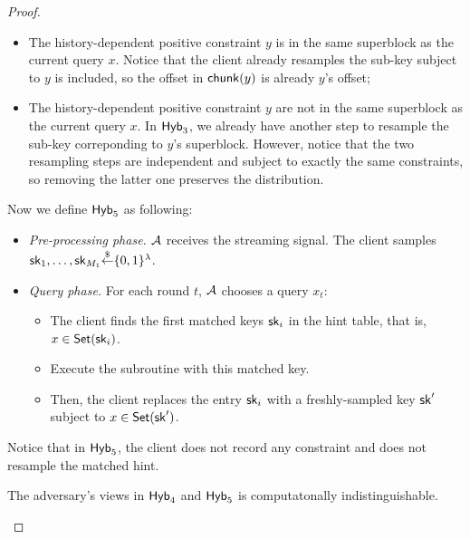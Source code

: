 \begin{proof}
\begin{itemize}
        \item The history-dependent positive constraint $y$ is in the same superblock as the current query $x$. 
        Notice that the client already resamples the sub-key subject to $y$ is included, so the offset in $\mathsf{chunk}(y)$ is already $y$'s offset;
        
        \item The history-dependent positive constraint $y$ are not in the same superblock as the current query $x$. In ${\sf Hyb}_3$, we already have another step to resample the sub-key correponding to $y$'s superblock. However, notice that the two resampling steps are independent and subject to exactly the same constraints, so removing the latter one preserves the distribution.
        
    \end{itemize}
    
    
    Now we define ${\sf Hyb}_5$ as following:
    
    \begin{itemize}
        \item \textit{Pre-processing phase.} $\mathcal{A}$ receives the streaming signal. The client samples $\mathsf{sk}_1,\dots,\mathsf{sk}_{M_1}{\overset{\$}{\leftarrow}}\{0,1\}^\lambda$. %
        \item \textit{Query phase.} For each round $t$, $\mathcal{A}$ chooses a query $x_t$:
        \begin{itemize}
            \item The client finds the first matched keys $\mathsf{sk}_i$ in the hint table, that is, $x\in\mathsf{Set}(\mathsf{sk}_i)$.
            
            \item Execute the subroutine with this matched key.
            
            \item Then, the client replaces the entry $\mathsf{sk}_i$ with a freshly-sampled key $\mathsf{sk}'$ subject to $x\in\mathsf{Set}(\mathsf{sk}')$.
            
        \end{itemize}
        
    \end{itemize}
    
    Notice that in ${\sf Hyb}_5$, the client does not record any constraint and does not resample the matched hint.
    
    \begin{myclaim}
        The adversary's views in ${\sf Hyb}_4$ and ${\sf Hyb}_5$ is computatonally indistinguishable.
    \end{myclaim}
    

\end{proof}
